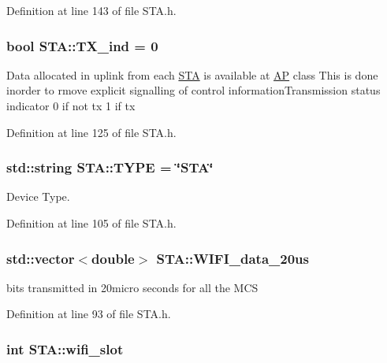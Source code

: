 Definition at line 143 of file S\-T\-A.\-h.

\hypertarget{classSTA_a0ad8be1dec7b752e1be4f13e03faae4c}{
\subsubsection[{T\-X\-\_\-ind}]{\setlength{\rightskip}{0pt plus 5cm}bool S\-T\-A\-::\-T\-X\-\_\-ind = 0}}\label{classSTA_a0ad8be1dec7b752e1be4f13e03faae4c}
Data allocated in uplink from each \hyperlink{classSTA}{S\-T\-A} is available at \hyperlink{classAP}{A\-P} class This is done inorder to rmove explicit signalling of control information\-Transmission status indicator 0 if not tx 1 if tx 

Definition at line 125 of file S\-T\-A.\-h.

\hypertarget{classSTA_a4ddff6315fc6fa20fd508a24dbe54a7d}{
\subsubsection[{T\-Y\-P\-E}]{\setlength{\rightskip}{0pt plus 5cm}std\-::string S\-T\-A\-::\-T\-Y\-P\-E = \char`\"{}S\-T\-A\char`\"{}}}\label{classSTA_a4ddff6315fc6fa20fd508a24dbe54a7d}


Device Type. 



Definition at line 105 of file S\-T\-A.\-h.

\hypertarget{classSTA_a97c786822c28334e2a1d351ae5fe9d52}{
\subsubsection[{W\-I\-F\-I\-\_\-data\-\_\-20us}]{\setlength{\rightskip}{0pt plus 5cm}std\-::vector$<$double$>$ S\-T\-A\-::\-W\-I\-F\-I\-\_\-data\-\_\-20us\hspace{0.3cm}{\ttfamily [private]}}}\label{classSTA_a97c786822c28334e2a1d351ae5fe9d52}


bits transmitted in 20micro seconds for all the M\-C\-S 



Definition at line 93 of file S\-T\-A.\-h.

\hypertarget{classSTA_a376c698ac01f5368b7e218609caa1a5a}{
\subsubsection[{wifi\-\_\-slot}]{\setlength{\rightskip}{0pt plus 5cm}int S\-T\-A\-::wifi\-\_\-slot\hspace{0.3cm}{\ttfamily [private]}}}\label{classSTA_a376c698ac01f5368b7e218609caa1a5a}


